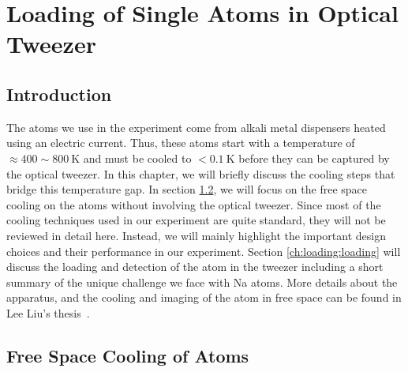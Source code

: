 
\chapter{Loading of Single Atoms in Optical Tweezer}
\label{ch:loading}

\section{Introduction}
\label{ch:loading:introduction}

The atoms we use in the experiment come from alkali metal dispensers
heated using an electric current. Thus, these atoms start with a temperature of
$\approx\!400\sim800~\mathrm{K}$ and must be cooled to $<\!0.1~\mathrm{K}$
before they can be captured by the optical tweezer.
In this chapter, we will briefly discuss the cooling steps that bridge this temperature gap.
In section \ref{ch:loading:free-space}, we will focus on the free space cooling
on the atoms without involving the optical tweezer.
Since most of the cooling techniques used in our experiment are quite standard,
they will not be reviewed in detail here.
Instead, we will mainly highlight the important design choices
and their performance in our experiment.
Section \ref{ch:loading:loading} will discuss the loading and detection
of the atom in the tweezer including a short summary of the unique challenge
we face with Na atoms.
More details about the apparatus, and the cooling and imaging of the atom
in free space can be found in Lee Liu's thesis~\cite{liu_building_2019}.

\section{Free Space Cooling of Atoms}
\label{ch:loading:free-space}

